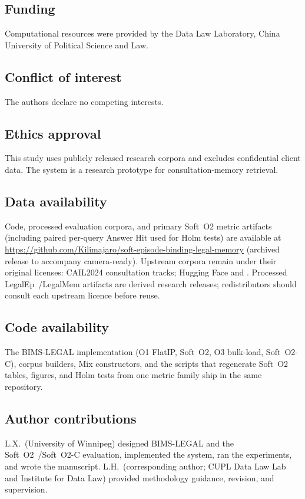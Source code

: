 \documentclass[preprint,12pt,authoryear]{elsarticle}
\begin{document}
\subsection*{Funding}
Computational resources were provided by the Data Law Laboratory, China University of Political Science and Law.

\subsection*{Conflict of interest}
The authors declare no competing interests.

\subsection*{Ethics approval}
This study uses publicly released research corpora and excludes confidential client data. The system is a research prototype for consultation-memory retrieval.

\subsection*{Data availability}
Code, processed evaluation corpora, and primary Soft~O2 metric artifacts (including paired per-query Answer Hit used for Holm tests) are available at
\url{https://github.com/Kilimajaro/soft-episode-binding-legal-memory}
(archived release to accompany camera-ready).
Upstream corpora remain under their original licenses: CAIL2024 consultation tracks; Hugging Face
 and
.
Processed LegalEp~/LegalMem artifacts are derived research releases; redistributors should consult each upstream licence before reuse.

\subsection*{Code availability}
The BIMS-LEGAL implementation (O1 FlatIP, Soft~O2, O3 bulk-load, Soft~O2-C), corpus builders, Mix constructors, and the scripts that regenerate Soft~O2 tables, figures, and Holm tests from one metric family ship in the same repository.

\subsection*{Author contributions}
\sloppy
L.X.\ (University of Winnipeg) designed BIMS-LEGAL and the Soft~O2~/Soft~O2-C evaluation, implemented the system, ran the experiments, and wrote the manuscript.
L.H.\ (corresponding author; CUPL Data Law Lab and Institute for Data Law) provided methodology guidance, revision, and supervision.
\end{document}
